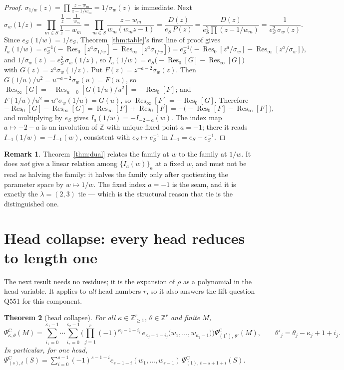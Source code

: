 \documentclass[11pt]{article}
\newtheorem{theorem}{Theorem}
\theoremstyle{definition}
\newtheorem{remark}[theorem]{Remark}
\theoremstyle{remark}
\DeclareMathOperator{\Res}{Res}
\newcommand{\PsiC}{\Psi^{\mathrm{C}}}
\begin{document}
\begin{proof}
$\sigma_{1/w}(z)=\prod\frac{z-w_m}{z-1/w_m}=1/\sigma_w(z)$ is immediate. Next
\[
  \sigma_w(1/z)=\prod_{m\in S}\frac{\tfrac1z-\tfrac1{w_m}}{\tfrac1z-w_m}
  =\prod_{m\in S}\frac{z-w_m}{w_m(w_mz-1)}
  =\frac{D(z)}{e_S\,P(z)}=\frac{D(z)}{e_S^2\prod(z-1/w_m)}
  =\frac{1}{e_S^2\,\sigma_w(z)} .
\]
Since $e_{S}(1/w)=1/e_S$, Theorem~\ref{thm:table}'s first line of proof gives
\[
  I_a(1/w)=e_S^{-1}\bigl(-\Res_0[z^a\sigma_{1/w}]-\Res_\infty[z^a\sigma_{1/w}]\bigr)
          =e_S^{-1}\bigl(-\Res_0[z^a/\sigma_w]-\Res_\infty[z^a/\sigma_w]\bigr),
\]
and $1/\sigma_w(z)=e_S^2\,\sigma_w(1/z)$, so
$I_a(1/w)=e_S\bigl(-\Res_0[G]-\Res_\infty[G]\bigr)$ with $G(z)=z^a\sigma_w(1/z)$.
Put $F(z)=z^{-a-2}\sigma_w(z)$. Then $G(1/u)/u^2=u^{-a-2}\sigma_w(u)=F(u)$, so
$\Res_\infty[G]=-\Res_{u=0}[G(1/u)/u^2]=-\Res_0[F]$; and
$F(1/u)/u^2=u^{a}\sigma_w(1/u)=G(u)$, so $\Res_\infty[F]=-\Res_0[G]$. Therefore
\[
  -\Res_0[G]-\Res_\infty[G]=\Res_\infty[F]+\Res_0[F]
  =-\bigl(-\Res_0[F]-\Res_\infty[F]\bigr),
\]
and multiplying by $e_S$ gives $I_a(1/w)=-I_{-2-a}(w)$. The index map $a\mapsto-2-a$ is an
involution of $\mathbb{Z}$ with unique fixed point $a=-1$; there it reads
$I_{-1}(1/w)=-I_{-1}(w)$, consistent with $e_S\mapsto e_S^{-1}$ in
$I_{-1}=e_S-e_S^{-1}$.
\end{proof}

\begin{remark}
Theorem~\ref{thm:dual} relates the family at $w$ to the family at $1/w$. It does
\emph{not} give a linear relation among $\{I_a(w)\}_{a}$ at a fixed $w$, and must not be
read as halving the family: it halves the family only after quotienting the parameter
space by $w\mapsto1/w$. The fixed index $a=-1$ is the seam, and it is exactly the
$\lambda=(2,3)$ tie --- which is the structural reason that tie is the distinguished one.
\end{remark}

\section{Head collapse: every head reduces to length one}

The next result needs no residues; it is the expansion of $\rho$ as a polynomial in the
head variable. It applies to \emph{all} head numbers $r$, so it also answers the lift
question Q551 for this component.

\begin{theorem}[head collapse]\label{thm:collapse}
For all $\kappa\in\mathbb{Z}_{\ge1}^r$, $\theta\in\mathbb{Z}^r$ and finite $M$,
\[
  \PsiC_{\kappa,\theta}(M)
  =\sum_{i_1=0}^{\kappa_1-1}\cdots\sum_{i_r=0}^{\kappa_r-1}
    \Biggl(\prod_{j=1}^{r}(-1)^{\kappa_j-1-i_j}\,
      e_{\kappa_j-1-i_j}\bigl(w_1,\dots,w_{\kappa_j-1}\bigr)\Biggr)
    \PsiC_{(1^r),\,\theta'}(M),
  \qquad \theta'_j=\theta_j-\kappa_j+1+i_j .
\]
In particular, for one head,
$\PsiC_{(s),t}(S)=\sum_{i=0}^{s-1}(-1)^{s-1-i}e_{s-1-i}(w_1,\dots,w_{s-1})\,
\PsiC_{(1),\,t-s+1+i}(S)$.
\end{theorem}
\end{document}
